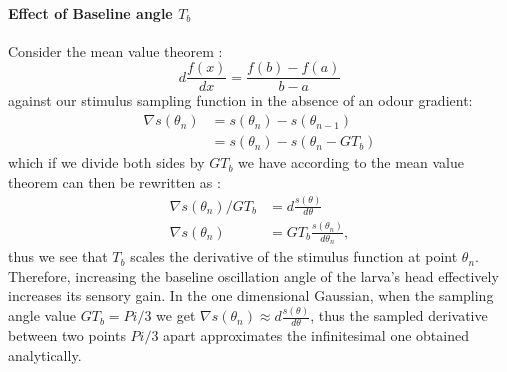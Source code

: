 \documentclass[10pt,a4paper]{article}
\begin{document}
\paragraph{Effect of Baseline angle $T_b$}
Consider the mean value theorem :
\begin{equation}
d\frac{f(x)}{dx} = \frac{f(b) - f(a)}{b-a}
\end{equation}
against our stimulus sampling function in the absence of an odour gradient:
\begin{align}
\nabla s(\theta_n) &= s(\theta_n) - s(\theta_{n-1})\nonumber \\
				   &= s(\theta_n) - s(\theta_{n} - G T_b)
\end{align}
which if we divide both sides by $G T_b$ we have  according to the mean value theorem can then be rewritten as :
\begin{align}
\nabla s(\theta_n)/G T_b &= d\frac{s(\theta)}{d\theta} \nonumber \\
       \nabla s(\theta_n) &= G T_b \frac{s(\theta_n)}{d\theta_n},
\end{align}
thus we see that $T_b$ scales the derivative of the stimulus function at point $\theta_n$. Therefore, increasing the baseline oscillation angle of the larva's head effectively increases its sensory gain.
In the one dimensional Gaussian, when the sampling angle value $G T_b = Pi/3$ we get $\nabla s(\theta_n) \approx d\frac{s(\theta)}{d\theta}$, thus the sampled derivative between two points $Pi/3$ apart approximates the infinitesimal one obtained analytically.
\end{document}
